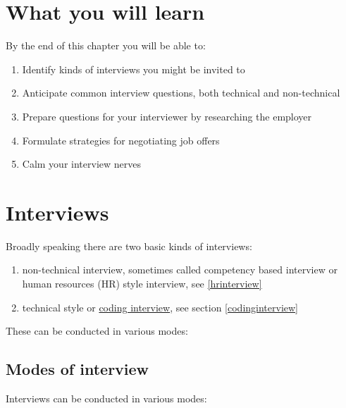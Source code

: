 \documentclass[
]{book}
\providecommand{\tightlist}{%
  \setlength{\itemsep}{0pt}\setlength{\parskip}{0pt}}
\begin{document}
\hypertarget{ilo9}{%
\section{What you will learn}\label{ilo9}}

By the end of this chapter you will be able to:

\begin{enumerate}
\def\labelenumi{\arabic{enumi}.}
\tightlist
\item
  Identify kinds of interviews you might be invited to
\item
  Anticipate common interview questions, both technical and non-technical
\item
  Prepare questions for your interviewer by researching the employer
\item
  Formulate strategies for negotiating job offers
\item
  Calm your interview nerves
\end{enumerate}

\hypertarget{interviews}{%
\section{Interviews}\label{interviews}}

Broadly speaking there are two basic kinds of interviews:

\begin{enumerate}
\def\labelenumi{\arabic{enumi}.}
\tightlist
\item
  non-technical interview, sometimes called competency based interview or human resources (HR) style interview, see \ref{hrinterview}
\item
  technical style or \href{https://en.wikipedia.org/wiki/Coding_interview}{coding interview}, see section \ref{codinginterview}
\end{enumerate}

These can be conducted in various modes:

\hypertarget{mode}{%
\subsection{Modes of interview}\label{mode}}

Interviews can be conducted in various modes:
\end{document}
